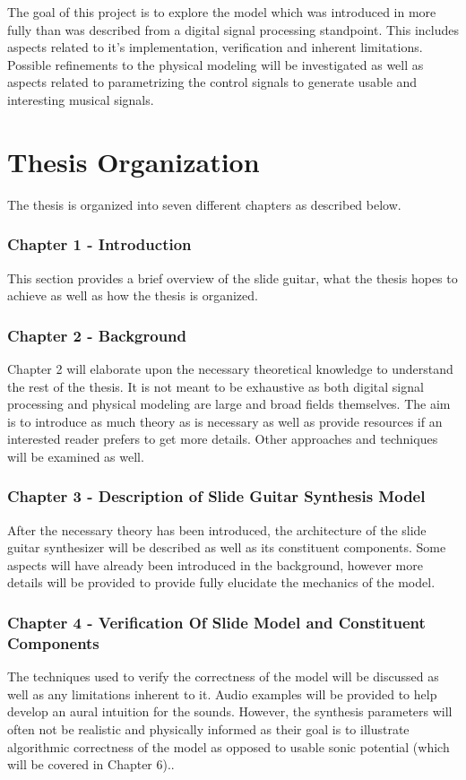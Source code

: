 \documentclass[../main.tex]{subfiles}
\begin{document}
The goal of this project is to explore the model which was introduced in \cite{pakarinen_virtual_2008} more fully than was described from a digital signal processing standpoint. This includes aspects related to it's implementation, verification and inherent limitations. Possible refinements to the physical modeling will be investigated as well as aspects related to parametrizing the control signals to generate usable and interesting musical signals.

\section{Thesis Organization}
The thesis is organized into seven different chapters as described below.

\subsubsection{Chapter 1 - Introduction}
This section provides a brief overview of the slide guitar, what the thesis hopes to achieve as well as how the thesis is organized.

\subsubsection{Chapter 2 - Background}
Chapter 2 will  elaborate upon the necessary theoretical knowledge to understand the rest of the thesis. It is not meant to be exhaustive as both digital signal processing and physical modeling are large and broad fields themselves. The aim is to introduce as much theory as is necessary as well as provide resources if an interested reader prefers to get more details. Other approaches and techniques will be examined as well.

\subsubsection{Chapter 3 - Description of Slide Guitar Synthesis Model}
After the necessary theory has been introduced, the architecture of the slide guitar synthesizer will be described as well as its constituent components. Some aspects will have already been introduced in the background, however more details will be provided to provide fully elucidate the mechanics of the model.

\subsubsection{Chapter 4 - Verification Of Slide Model and Constituent Components}
The techniques used to verify the correctness of the model will be discussed as well as any limitations inherent to it. Audio examples will be provided to help develop an aural intuition for the sounds. However, the synthesis parameters will often not be realistic and physically informed as their goal is to illustrate algorithmic correctness of the model as opposed to usable sonic potential (which will be covered in Chapter 6)..
\end{document}
